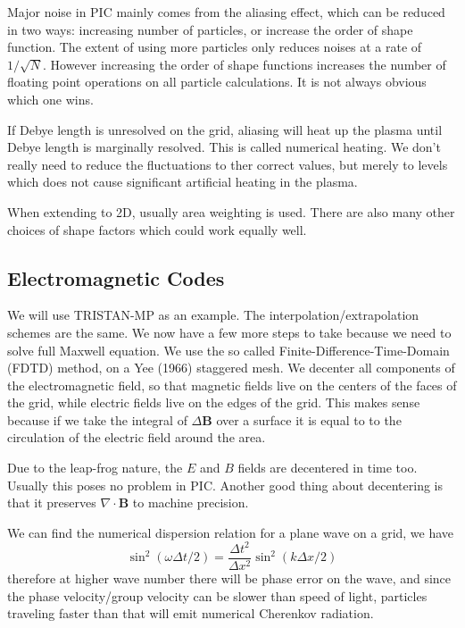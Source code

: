 \documentclass[letterpaper, 11pt]{article}
\numberwithin{equation}{section}
\numberwithin{figure}{section}
\begin{document}
Major noise in PIC mainly comes from the aliasing effect, which can be reduced
in two ways: increasing number of particles, or increase the order of shape
function. The extent of using more particles only reduces noises at a rate of
$1/\sqrt{N}$. However increasing the order of shape functions increases the
number of floating point operations on all particle calculations. It is not
always obvious which one wins.

If Debye length is unresolved on the grid, aliasing will heat up the plasma
until Debye length is marginally resolved. This is called numerical heating. We
don't really need to reduce the fluctuations to ther correct values, but merely
to levels which does not cause significant artificial heating in the plasma.

When extending to 2D, usually area weighting is used. There are also many other
choices of shape factors which could work equally well.

\subsection{Electromagnetic Codes}

We will use TRISTAN-MP as an example. The interpolation/extrapolation schemes
are the same. We now have a few more steps to take because we need to solve full
Maxwell equation. We use the so called Finite-Difference-Time-Domain (FDTD)
method, on a Yee (1966) staggered mesh. We decenter all components of the
electromagnetic field, so that magnetic fields live on the centers of the faces
of the grid, while electric fields live on the edges of the grid. This makes
sense because if we take the integral of $\Delta \mathbf{B}$ over a surface it
is equal to to the circulation of the electric field around the area.

Due to the leap-frog nature, the $E$ and $B$ fields are decentered in time too.
Usually this poses no problem in PIC. Another good thing about decentering is
that it preserves $\nabla\cdot \mathbf{B}$ to machine precision.

We can find the numerical dispersion relation for a plane wave on a grid, we
have
\begin{equation}
  \label{eq:3}
  \sin^2(\omega\Delta t/2) = \frac{\Delta t^2}{\Delta x^2}\sin^2(k\Delta x / 2)
\end{equation}
therefore at higher wave number there will be phase error on the wave, and since
the phase velocity/group velocity can be slower than speed of light, particles
traveling faster than that will emit numerical Cherenkov radiation.
\end{document}
